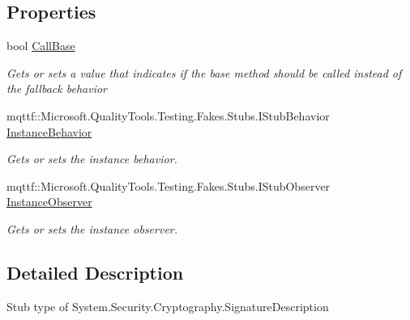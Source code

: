 \subsection*{Properties}
\begin{DoxyCompactItemize}
\item 
bool \hyperlink{class_system_1_1_security_1_1_cryptography_1_1_fakes_1_1_stub_signature_description_a2d8d0c5fc2e1643d0f3d2b6c7241cb5a}{Call\-Base}
\begin{DoxyCompactList}\small\item\em Gets or sets a value that indicates if the base method should be called instead of the fallback behavior\end{DoxyCompactList}\item 
mqttf\-::\-Microsoft.\-Quality\-Tools.\-Testing.\-Fakes.\-Stubs.\-I\-Stub\-Behavior \hyperlink{class_system_1_1_security_1_1_cryptography_1_1_fakes_1_1_stub_signature_description_a54a3dffd8deb91f7bb4f4e870cea9209}{Instance\-Behavior}
\begin{DoxyCompactList}\small\item\em Gets or sets the instance behavior.\end{DoxyCompactList}\item 
mqttf\-::\-Microsoft.\-Quality\-Tools.\-Testing.\-Fakes.\-Stubs.\-I\-Stub\-Observer \hyperlink{class_system_1_1_security_1_1_cryptography_1_1_fakes_1_1_stub_signature_description_a70c27ecac5633aad37ed04fd68ae6d9f}{Instance\-Observer}
\begin{DoxyCompactList}\small\item\em Gets or sets the instance observer.\end{DoxyCompactList}\end{DoxyCompactItemize}


\subsection{Detailed Description}
Stub type of System.\-Security.\-Cryptography.\-Signature\-Description



